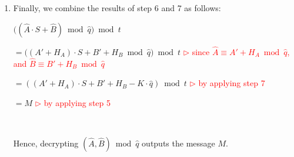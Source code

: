 \begin{enumerate}
$ = \dfrac{\hat{q}}{q_{l}}\cdot(A\cdot S + B  - K\cdot q_{l}) + H_A\cdot S + H_B - \dfrac{\epsilon'_A}{q_{l}}\cdot S - \dfrac{\epsilon'_B}{q_{l}}$ \textcolor{red}{ $\rhd$ taking out the common factor $\dfrac{\hat{q}}{q_{l}}$}

$ = \dfrac{\hat{q}}{q_{l}}\cdot(A\cdot S + B \bmod q_l) + H_A\cdot S + H_B - \dfrac{\epsilon'_A\cdot S + \epsilon'_B}{q_{l}}$ \textcolor{red}{ $\rhd$ since $A\cdot S + B - K\cdot q_{l} = A\cdot S + B \bmod q_l$}

$ $

For successful decryption, every coefficient of the resulting polynomial of the above expression has to be within the range $\mathbb{Z}_{\hat{q}}$ (which means that $K\cdot\hat{q}$ has successfully reduced $(A' + H_A)\cdot S + B' + H_B$ modulo $\hat{q}$). The first term $\dfrac{\hat{q}}{q_{l}}\cdot(A\cdot S + B \bmod q_l)$ can be viewed as the original ciphertext \textsf{ct}'s noise (with the plaintext message) scaled down by $\dfrac{\hat{q}}{q_l}$, which is guaranteed to be within the $\mathbb{Z}_{\hat{q}}$ range. The coefficients of the second term $H_A \cdot S$ are also small, because $H_A \in \mathbb{Z}_t^n$ and $S \in \{-1, 0, 1\}^n$. The coefficients of the third term $H_B$ are also small, because $H_B \in \mathbb{Z}_t^n$. The coefficients of the last term $- \dfrac{\epsilon'_A\cdot S + \epsilon'_B}{q_{l}}$ are also small, because $\dfrac{\epsilon'_A}{q_l}$ and $\dfrac{\epsilon'_B}{q_l}$ are $\in \mathbb{Z}_{\frac{q_l}{\hat{q}}}$. 

$ $

Therefore, $(A' + H_A)\cdot S + B' + H_B - K\cdot \hat{q} = (A' + H_A)\cdot S + B' + H_B \bmod \hat{q}$ (provided the above error thresholds hold). 

$ $

\item Finally, we combine the results of step 6 and 7 as follows: 

$\bm((\hat{A}\cdot S + \hat{B}) \bmod \hat{q} \bm) \bmod t$

$= \bm((A' + H_A)\cdot S + B' + H_B \bmod \hat{q}\bm) \bmod t$ \textcolor{red}{ $\rhd$ since $\hat{A} \equiv A' + H_A \bmod \hat{q}$, and $\hat{B} \equiv B' + H_B \bmod \hat{q}$}

$ = ((A' + H_A)\cdot S + B' + H_B - K\cdot \hat{q}) \bmod t$ \textcolor{red}{ $\rhd$ by applying step 7}

$ = M$ \textcolor{red}{ $\rhd$ by applying step 5}

$ $

Hence, decrypting $(\hat{A}, \hat{B}) \bmod \hat{q}$ outputs the message $M$.

\end{enumerate}

